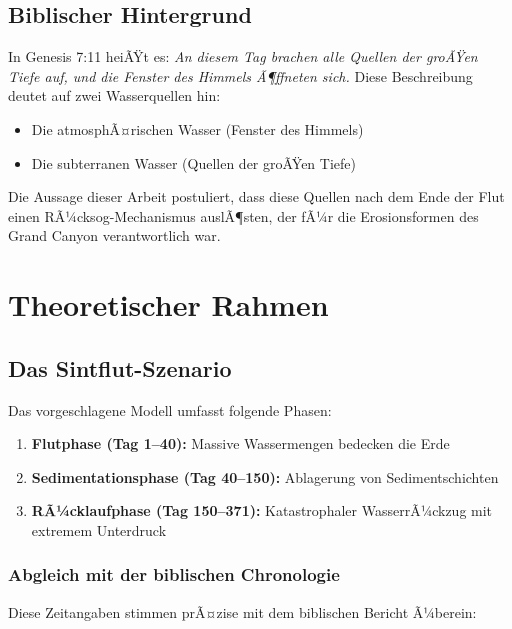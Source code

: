 ﻿\documentclass[12pt,a4paper]{report}
\begin{document}
\section{Biblischer Hintergrund}

In Genesis 7:11 heiÃŸt es: \textit{An diesem Tag brachen alle Quellen der groÃŸen Tiefe auf, und die Fenster des Himmels Ã¶ffneten sich.} Diese Beschreibung deutet auf zwei Wasserquellen hin:

\begin{itemize}
	\item Die atmosphÃ¤rischen Wasser (Fenster des Himmels)
	\item Die subterranen Wasser (Quellen der groÃŸen Tiefe)
\end{itemize}

Die Aussage dieser Arbeit postuliert, dass diese Quellen nach dem Ende der Flut einen RÃ¼cksog-Mechanismus auslÃ¶sten, der fÃ¼r die Erosionsformen des Grand Canyon verantwortlich war.

\chapter{Theoretischer Rahmen}

\section{Das Sintflut-Szenario}

Das vorgeschlagene Modell umfasst folgende Phasen:

\begin{enumerate}
	\item \textbf{Flutphase (Tag 1--40):} Massive Wassermengen bedecken die Erde
	\item \textbf{Sedimentationsphase (Tag 40--150):} Ablagerung von Sedimentschichten
	\item \textbf{RÃ¼cklaufphase (Tag 150--371):} Katastrophaler WasserrÃ¼ckzug mit extremem Unterdruck
\end{enumerate}

\subsection{Abgleich mit der biblischen Chronologie}

Diese Zeitangaben stimmen prÃ¤zise mit dem biblischen Bericht Ã¼berein:
\end{document}
